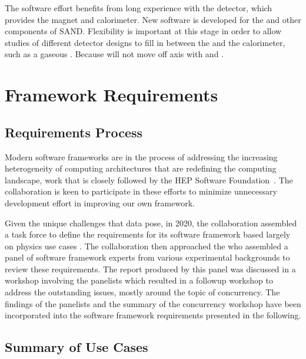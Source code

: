 \documentclass[../main-v1.tex]{subfiles}
\begin{document}
The  software effort benefits from long experience with the  detector, which provides the magnet and calorimeter.  New software is developed for the  and other components of SAND.  Flexibility is important at this stage in order to allow studies of different detector designs to fill in between the  and the calorimeter, such as a gaseous .  Because  will not move off axis with  and .


\section{Framework Requirements }
\subsection{Requirements Process} %
Modern  software frameworks are in the process of addressing the increasing heterogeneity of computing architectures that are redefining the computing landscape, work that is closely followed by the HEP Software Foundation~\cite{Alves:2017she, Calafiura:2018rwe}. The  collaboration is keen to participate in these efforts to minimize unnecessary development effort in improving our own framework. 

Given the unique challenges that  data pose, in 2020, the collaboration assembled a task force to define the requirements for its software framework based largely on physics use cases \cite{bib:docdb21934}.  The collaboration then approached the  who assembled a panel of software framework experts from various experimental backgrounds to review these requirements. The report \cite{bib:docdb24423} produced by this panel was discussed in a workshop involving the panelists which resulted in a followup workshop to address the outstanding issues, mostly around the topic of concurrency.  The findings of the panelists and the summary of the concurrency workshop \cite{bib:docdb24426} have been incorporated into the  software framework requirements presented in the following.

\subsection{Summary of Use Cases}

\end{document}
